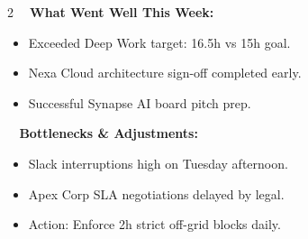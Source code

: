 \documentclass[10pt, landscape]{article}
\begin{document}
\begin{minipage}[t]{0.68\linewidth}
  \vspace{4pt}

  \begin{tcolorbox}[lightbox, title={\faSync~ WEEKLY RETROSPECTIVE \& TIME AUDIT ANALYSIS}]
    \begin{multicols}{2}
      \textbf{\color{ExecNavy}\faCheckCircle~ What Went Well This Week:}
      \begin{itemize}[leftmargin=10pt, itemsep=1pt, topsep=1pt]
        \tiny
        \item Exceeded Deep Work target: 16.5h vs 15h goal.
        \item Nexa Cloud architecture sign-off completed early.
        \item Successful Synapse AI board pitch prep.
      \end{itemize}

      \columnbreak

      \textbf{\color{ExecGold}\faExclamationCircle~ Bottlenecks \& Adjustments:}
      \begin{itemize}[leftmargin=10pt, itemsep=1pt, topsep=1pt]
        \tiny
        \item Slack interruptions high on Tuesday afternoon.
        \item Apex Corp SLA negotiations delayed by legal.
        \item Action: Enforce 2h strict off-grid blocks daily.
      \end{itemize}
    \end{multicols}
  \end{tcolorbox}

\end{minipage}%
\hfill
\end{document}
